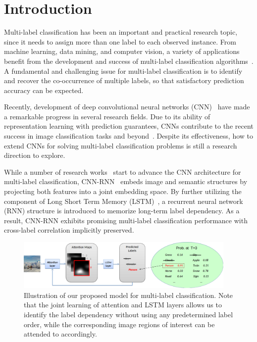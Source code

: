 \documentclass[letterpaper]{article} %
\begin{document}
\section{Introduction}
\label{sec:intro}

Multi-label classification has been an important and practical research topic, since it needs to assign more than one label to each observed instance. From machine learning, data mining, and computer vision, a variety of applications benefit from the development and success of multi-label classification algorithms~\cite{zhang2014review,boutell2004learning,schapire2000boostexter,godbole2004discriminative,lin2014microsoft,kang2016object,kang2016t,boutell2004learning,shao2016slicing}. A fundamental and challenging issue for multi-label classification is to identify and recover the co-occurrence of multiple labels, so that satisfactory prediction accuracy can be expected.


Recently, development of deep convolutional neural networks (CNN)~\cite{krizhevsky2012imagenet,szegedy2015going,simonyan2014very,he2016deep} have made a remarkable progress in several research fields. Due to its ability of representation learning with prediction guarantees, CNNs contribute to the recent success in image classification tasks and beyond~\cite{deng2009imagenet,fei2007learning,griffin2007caltech}.
Despite its effectiveness, how to extend CNNs for solving multi-label classification problems is still a research direction to explore.

While a number of research works~\cite{zhang2006multilabel,nam2014large,gong2013deep,wei2014cnn,wang2016cnn} start to advance the CNN architecture for multi-label classification, CNN-RNN~\cite{wang2016cnn} embeds image and semantic structures by projecting both features into a joint embedding space. By further utilizing the component of Long Short Term Memory (LSTM)~\cite{hochreiter1997long}, a recurrent neural network (RNN) structure is introduced to memorize long-term label dependency. As a result, CNN-RNN exhibits promising multi-label classification performance with cross-label correlation implicitly preserved.


\begin{figure}[t!]
\centering
\includegraphics[width=0.95\textwidth]{./intro_fig.png}
\caption{Illustration of our proposed model for multi-label classification. Note that the joint learning of attention and LSTM layers allows us to identify the label dependency without using any predetermined label order, while the corresponding image regions of interest can be attended to accordingly.}
\label{fig:1}
\end{figure}
\end{document}
